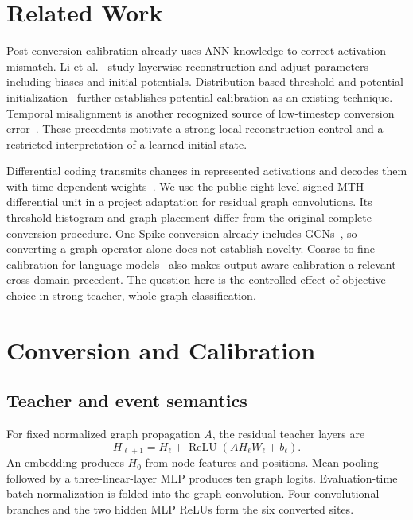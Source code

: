 \documentclass[10pt,twocolumn]{article}
\begin{document}
\section{Related Work}
Post-conversion calibration already uses ANN knowledge to correct activation mismatch. Li et al.~\citep{li2021} study layerwise reconstruction and adjust parameters including biases and initial potentials. Distribution-based threshold and potential initialization~\citep{bojkovic2024} further establishes potential calibration as an existing technique. Temporal misalignment is another recognized source of low-timestep conversion error~\citep{bojkovic2025}. These precedents motivate a strong local reconstruction control and a restricted interpretation of a learned initial state.

Differential coding transmits changes in represented activations and decodes them with time-dependent weights~\citep{huang2025}. We use the public eight-level signed MTH differential unit in a project adaptation for residual graph convolutions. Its threshold histogram and graph placement differ from the original complete conversion procedure. One-Spike conversion already includes GCNs~\citep{onespike2024}, so converting a graph operator alone does not establish novelty. Coarse-to-fine calibration for language models~\citep{fas2025} also makes output-aware calibration a relevant cross-domain precedent. The question here is the controlled effect of objective choice in strong-teacher, whole-graph classification.

\section{Conversion and Calibration}
\subsection{Teacher and event semantics}
For fixed normalized graph propagation $A$, the residual teacher layers are
\begin{equation}
 H_{\ell+1}=H_\ell+\operatorname{ReLU}(A H_\ell W_\ell+b_\ell).
\end{equation}
An embedding produces $H_0$ from node features and positions. Mean pooling followed by a three-linear-layer MLP produces ten graph logits. Evaluation-time batch normalization is folded into the graph convolution. Four convolutional branches and the two hidden MLP ReLUs form the six converted sites.
\end{document}
